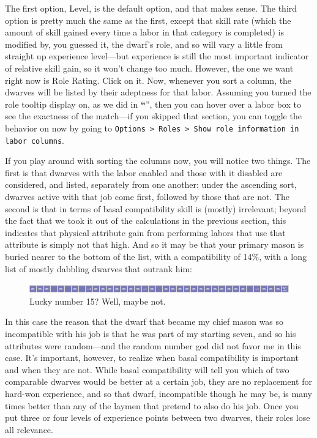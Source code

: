 \documentclass[]{article}
\newcommand{\jump}[1] {\textbf{``\nameref{sec:#1}}''}
\begin{document}
The first option, Level, is the default option, and that makes sense. The third option is pretty much the
same as the first, except that skill rate (which the amount of skill gained every time a labor in that
category is completed) is modified by, you guessed it, the dwarf's role, and so will vary a little from
straight up experience level---but experience is still the most important indicator of relative skill
gain, so it won't change too much. However, the one we want right now is Role Rating. Click on it. Now,
whenever you sort a column, the dwarves will be listed by their adeptness for that labor. Assuming you
turned the role tooltip display on, as we did in \jump{Formatting Your Display}, then
you can hover over a labor box to see the exactness of the match---if you skipped that section, you can
toggle the behavior on now by going to \texttt{Options > Roles > Show role information in labor columns}.

If you play around with sorting the columns now, you will notice two things. The first is that dwarves
with the labor enabled and those with it disabled are considered, and listed, separately from one
another: under the ascending sort, dwarves active with that job come first, followed by those that are
not. The second is that in terms of basal compatibility skill is (mostly) irrelevant; beyond the fact
that we took it out of the calculations in the previous section, this indicates that physical attribute
gain from performing labors that use that attribute is simply not that high. And so it may be that your
primary mason is buried nearer to the bottom of the list, with a compatibility of 14\%, with a long list
of mostly dabbling dwarves that outrank him:
\begin{figure}[h!]
\centering
\vspace{-5pt}
\includegraphics[scale=.85]{Sec3Fig4}
\vspace{-5pt}
\caption{Lucky number 15? Well, maybe not.}
\vspace{-10pt}
\end{figure}

In this case the reason that the dwarf that became my chief mason was so incompatible with his job is
that he was part of my starting seven, and so his attributes were random---and the random number god did
not favor me in this case. It's important, however, to realize when basal compatibility is important and
when they are not. While basal compatibility will tell you which of two comparable dwarves would be
better at a certain job, they are no replacement for hard-won experience, and so that dwarf, incompatible
though he may be, is many times better than any of the laymen that pretend to also do his job. Once you
put three or four levels of experience points between two dwarves, their roles lose all relevance.
\end{document}
